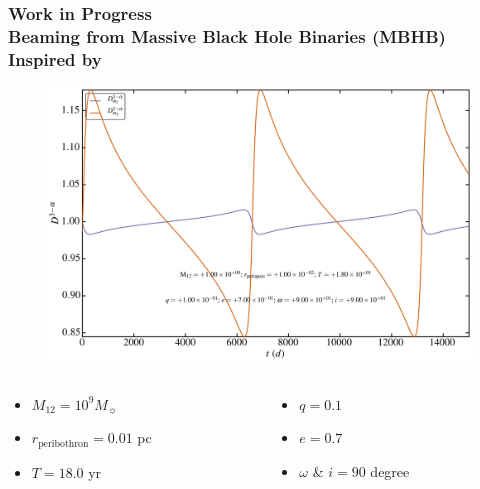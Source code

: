 \documentclass[hyperref={pdfpagelabels=false}]{beamer}
\begin{document}
\begin{frame}
\frametitle{Work in Progress\\Beaming from Massive Black Hole Binaries (MBHB)\\{\tiny Inspired by \citet*{binarySMBHNature15}}}
        \begin{figure}
          \includegraphics[scale=0.05]{images/beamingFactor.jpg}
        \end{figure}
  \begin{columns}
  \centering
    \begin{column}{0.5\textwidth}
      \begin{itemize}
        \item $M_{12} = 10^{9} M_{\sun}$
        \item $r_{\mathrm{peribothron}} = 0.01$ pc
        \item $T = 18.0$ yr
      \end{itemize}
    \end{column}
    \begin{column}{0.5\textwidth}
      \begin{itemize}
        \item $q = 0.1$
        \item $e = 0.7$
        \item $\omega$ \& $i = 90$ degree
      \end{itemize}
    \end{column}
  \end{columns}
\end{frame}
\end{document}
